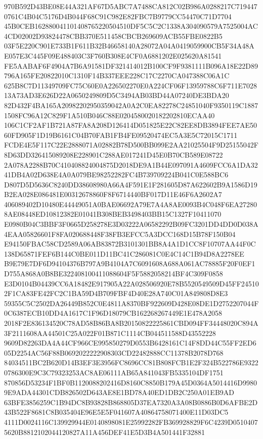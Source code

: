 \documentclass[UTF8,fontset=fandol,zihao=-4,a4paper]{ctexart}
\begin{document}
{{970B592D43BE08E44A321AF67D5ABC7A7488CA812C02B986A0288217C7194470761C4B04C5176D4B044F68C91C982E82FBC7B9779CC54470C71D7704
45B0CEB162880041101408765220504510DF5C5C2C1338A304090579A7525004AC4CD02002D93824478CBB370E511458CBCB269609ACB55FBE0822B5
03F5E220C901E733B1F611B32B46658140A28072A04A0419059900CB5F34A48AE057E3C445F09E488403C3F760B308E4CF0A6881202E025620A81541
FE5AABAF6F4904A7B6A91581DF321414012B100CF9F9381111B096A18E22D89796A165FE20822010C1310F14B337EEE228C17C2270CA047388C06A1C
625B8C7D11349709FC75C60E0A226502270E0A224CF06F13959788C6F711E702813A73AD3E626D22A0650249809D5C3494AB03BD44A07240DE3BDA20
82D432F4BA165A20982202950359042A0A2C0EA82278C24851040F9350119C18871508FC96A12C829F1A510B046C88E0204580020182202810ECAA40
106C1CF2AF1B721A87FA8A208D126414D051825E22C82EE8DB3894FEE7AE5060FD905F1D19B6161C04B70FAB1FB4FE09520474EC5A3E5C72015C1711
FCDE4E5F117C22E2888071A02882B78D500BB099E2AA21025504F9D25155042F8D63DD326415089208E228901C288AE017241D45E0B70CB589E08722
2A078A2288B70C410408824004875D2018DE9A1B44E097091A4609FCC6A1DA3241DB4A02D638E4A0A079BE98252282FC4B739709224B041C0E588BC6
D807D5D5636C8240DD38608980A66A4F591E1F281605D87A622602B9A1586D19B2EA028E086481E00312678860F8F6714440BF017D11E46F6A2602A7
406089402D10480E44449051A0BAE06692A79E7A4A8AE0093B4C048F6EA272808AE08448ED10812382E01041B308BEB3498403BB15C1327F10411070
E0980B04C3BBF3F0665D258278E3D03222A06582292B09FC3201DD4DD0D038A4EAA05826601F8FA020688448F38FB3EFCC5A3DCC168D15B78F150B04
E94150FBAC58CD2589A06AB83872B3101301BB8A4A1D1CC8F10707AA44F0C138D65871FEF6B144C0BE011D11BC41C286081C0E4C14C1B94D8A2278EE
B9E79E7DF6D94104376B797A9B4104A7C6091608A688A061AC78885F20F0EF1D755A868A0B8BE322408100411088604F5F5882058214BF4C309F0858
E3D0104B04439CC6A18482E917905A22A028506920E78B5520549509D45FF245102F1CA83FE42FC2C1BA59D4B709FBF4D40E28A740C01A849808D8E3
59355C5C2502DA26449B852C0E4811A8370BF922609D428E08DE1D2752207044F0C6387ECB10DD4A1617C1F96D18079CB162268267449E1E478A2058
2018F2E836134520C78AD58B86BA8B20150822225861CBD094FF34448020C894A3F2111608AA44501C25A022F01B871C1114CB044511588D43552228
9609D82263DA4A44CF966CE995850279D0553B6428161C14F8DD44C55FF2ED605D2254AC56F88B0692022222908303CD22482888CC11378B2078D768
84034511BC2B620D14B3EF3E3956FC8696CC81B808FCB1E2F324B522786E93220786300E9C3C79323253AC8AE06111AB65A841043FB5335104DF1751
870856D53234F1BF0B1120088202416D8160C8850B179A45D0364A5014416D99809E9ADA44301CDB826502D643AE8E1BD78A40ED1DB2C250A01EB9AD
63BFE3856259C1B94DC8B93828B868805D37EA7320A3A08B0886B0D6AFBE2D43B522F8681C8B035404E96E5E5F041607A40864758071400E11D03DC5
4111D0024116C139929944E0140898081E25992282FB369928829F6C4239D05104075620B8812102044120827A11A456DEF41E5D3B4A501441F32881
}}
\end{document}
